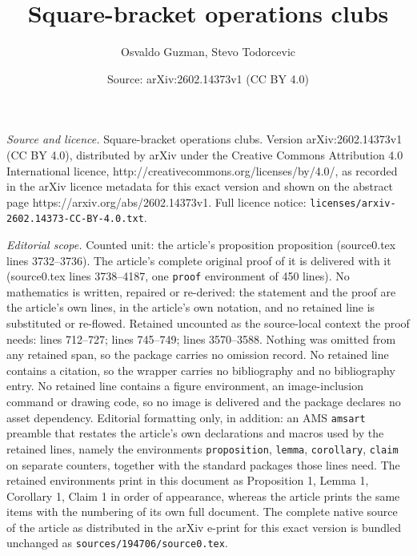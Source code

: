 \documentclass[10pt,a4paper]{amsart}
\title{Square-bracket operations clubs}
\author{Osvaldo Guzman, Stevo Todorcevic}
\date{Source: arXiv:2602.14373v1 (CC BY 4.0)}
\begin{document}
\maketitle

\noindent\emph{Source and licence.} Square-bracket operations clubs. Version arXiv:2602.14373v1 (CC BY 4.0), distributed by arXiv under the Creative Commons Attribution 4.0 International licence, http://creativecommons.org/licenses/by/4.0/, as recorded in the arXiv licence metadata for this exact version and shown on the abstract page https://arxiv.org/abs/2602.14373v1. Full licence notice: \texttt{licenses/arxiv-2602.14373-CC-BY-4.0.txt}.\par\smallskip

\noindent\textit{Editorial scope.} Counted unit: the article's proposition proposition (source0.tex lines 3732--3736). The article's complete original proof of it is delivered with it (source0.tex lines 3738--4187, one \texttt{proof} environment of 450 lines). No mathematics is written, repaired or re-derived: the statement and the proof are the article's own lines, in the article's own notation, and no retained line is substituted or re-flowed.  Retained uncounted as the source-local context the proof needs: lines 712--727; lines 745--749; lines 3570--3588.  Nothing was omitted from any retained span, so the package carries no omission record.  No retained line contains a citation, so the wrapper carries no bibliography and no bibliography entry.  No retained line contains a figure environment, an image-inclusion command or drawing code, so no image is delivered and the package declares no asset dependency.  Editorial formatting only, in addition: an AMS \texttt{amsart} preamble that restates the article's own declarations and macros used by the retained lines, namely the environments \texttt{proposition}, \texttt{lemma}, \texttt{corollary}, \texttt{claim} on separate counters, together with the standard packages those lines need.  The retained environments print in this document as Proposition 1, Lemma 1, Corollary 1, Claim 1 in order of appearance, whereas the article prints the same items with the numbering of its own full document.  The complete native source of the article as distributed in the arXiv e-print for this exact version is bundled unchanged as \texttt{sources/194706/source0.tex}.
\end{document}
